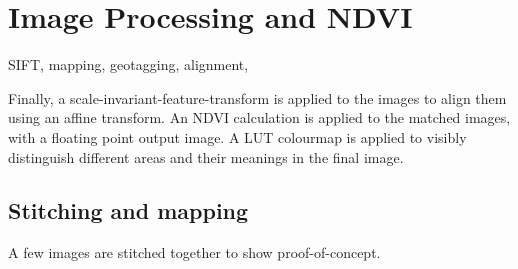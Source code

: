 \chapter{Image Processing and NDVI}
SIFT, mapping, geotagging, alignment,

Finally, a scale-invariant-feature-transform is applied to the images to align them using an affine transform. An NDVI calculation is applied to the matched images, with a floating point output image. A LUT colourmap is applied to visibly distinguish different areas and their meanings in the final image.

\section{Stitching and mapping}

A few images are stitched together to show proof-of-concept.